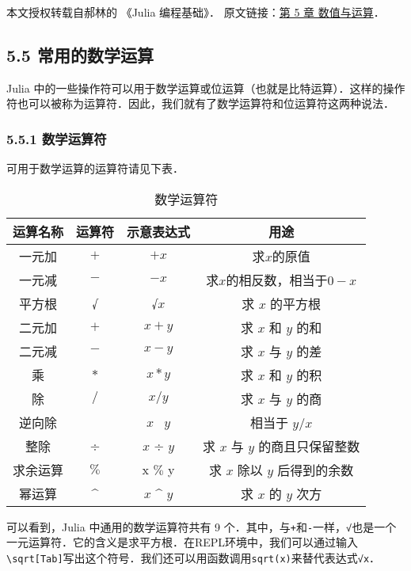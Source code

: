 
本文授权转载自郝林的 《Julia 编程基础》． 原文链接：\href{https://github.com/hyper0x/JuliaBasics/blob/master/book/ch05.md}{第 5 章 数值与运算}．


\subsection{5.5 常用的数学运算}

Julia 中的一些操作符可以用于数学运算或位运算（也就是比特运算）．这样的操作符也可以被称为运算符．因此，我们就有了数学运算符和位运算符这两种说法．

\subsubsection{5.5.1 数学运算符}

可用于数学运算的运算符请见下表．
\begin{table}[ht]
\centering
\caption{数学运算符}\label{JuC5S5_tab1}
\begin{tabular}{|c|c|c|c|}
\hline
运算名称 & 运算符 & 示意表达式 & 用途 \\
\hline
一元加 & $+$ & $+x$ & 求$x$的原值 \\
\hline
一元减 & $-$ & $-x$ & 求$x$的相反数，相当于$0-x$ \\
\hline
平方根 & √ & √$x$ & 求 $x$ 的平方根 \\
\hline
二元加 & $+$ & $x + y$ & 求 $x$ 和 $y$ 的和 \\
\hline
二元减 & $-$ & $x - y$ & 求 $x$ 与 $y$ 的差 \\
\hline
乘 & $*$ & $x * y$ & 求 $x$ 和 $y$ 的积 \\
\hline
除 & $/$ & $x / y$ & 求 $x$ 与 $y$ 的商 \\
\hline
逆向除 & \ & $x$ \ $y$ & 相当于 $y / x$ \\
\hline
整除 & ÷ & $x$ ÷ $y$ & 求 $x$ 与 $y$ 的商且只保留整数 \\
\hline
求余运算 & $\%$ & x $\%$ y & 求 $x$ 除以 $y$ 后得到的余数 \\
\hline
幂运算 & ^ & $x$ ^ $y$ & 求 $x$ 的 $y$ 次方 \\
\hline
\end{tabular}
\end{table}

可以看到，Julia 中通用的数学运算符共有 9 个．其中，与\verb|+|和\verb|-|一样，\verb|√|也是一个一元运算符．它的含义是求平方根．在REPL环境中，我们可以通过输入\verb|\sqrt[Tab]|写出这个符号．我们还可以用函数调用\verb|sqrt(x)|来替代表达式\verb|√x|．

